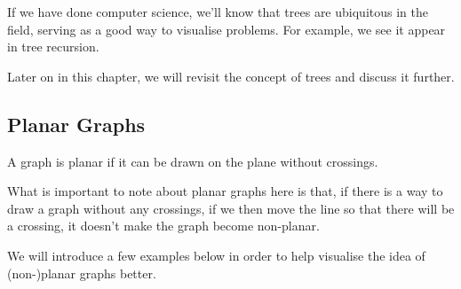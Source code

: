 \documentclass[openany]{book}
\begin{document}
If we have done computer science, we'll know that trees are ubiquitous in the field, serving as a good way to visualise problems. For example, we see it appear in tree recursion.

Later on in this chapter, we will revisit the concept of trees and discuss it further.

\subsection{Planar Graphs}
\begin{defn}
	A graph is planar if it can be drawn on the plane without crossings.
\end{defn}

What is important to note about planar graphs here is that, if there is a way to draw a graph without any crossings, if we then move the line so that there will be a crossing, it doesn't make the graph become non-planar.

We will introduce a few examples below in order to help visualise the idea of (non-)planar graphs better.
\end{document}
